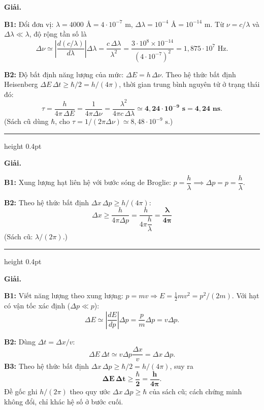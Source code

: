 \documentclass[11pt,a4paper]{article}
\renewcommand{\boldsymbol}[1]{\symbf{#1}}
\let\DeBaiOriginal\DeBai
\renewcommand{\DeBai}[1]{\par\Needspace{5\baselineskip}\DeBaiOriginal{#1}}
\newcommand{\PhanCachBai}{%
  \par\Needspace{7\baselineskip}%
  \addvspace{6pt}%
  {\color{black!40}\hrule height 0.4pt}%
  \nobreak\vspace{7pt}\nobreak
}
\begin{document}

\textbf{Giải.}

\textbf{B1:} Đổi đơn vị:
$\lambda=4000\text{ \AA}=4\cdot10^{-7}\text{ m}$,
$\Delta\lambda=10^{-4}\text{ \AA}=10^{-14}\text{ m}$.
Từ $\nu=c/\lambda$ và $\Delta\lambda\ll\lambda$, độ rộng tần số là
\[
\Delta\nu\simeq\left|\frac{d(c/\lambda)}{d\lambda}\right|\Delta\lambda
=\frac{c\,\Delta\lambda}{\lambda^2}
=\frac{3\cdot10^8\times10^{-14}}{(4\cdot10^{-7})^2}
=1{,}875\cdot10^7\text{ Hz}.
\]

\textbf{B2:} Độ bất định năng lượng của mức: $\Delta E=h\,\Delta\nu$.
Theo hệ thức bất định Heisenberg $\Delta E\,\Delta t\ge\hbar/2=h/(4\pi)$,
thời gian trung bình nguyên tử ở trạng thái đó:
\[
\tau=\frac{h}{4\pi\,\Delta E}=\frac1{4\pi\Delta\nu}
=\frac{\lambda^2}{4\pi c\,\Delta\lambda}
\simeq\boldsymbol{4{,}24\cdot10^{-9}\text{ s}=4{,}24\text{ ns}}.
\]
(Sách cũ dùng $\hbar$, cho $\tau=1/(2\pi\Delta\nu)\simeq8{,}48\cdot10^{-9}\text{ s}$.)

\PhanCachBai


\textbf{Giải.}

\textbf{B1:} Xung lượng hạt liên hệ với bước sóng de Broglie: $p = \dfrac{h}{\lambda} \implies \Delta p = p = \dfrac{h}{\lambda}$.

\textbf{B2:} Theo hệ thức bất định $\Delta x\,\Delta p\ge h/(4\pi)$:
\begin{equation*}
    \Delta x \ge \frac{h}{4\pi \Delta p} = \frac{h}{4\pi \dfrac{h}{\lambda}} = \boldsymbol{\frac{\lambda}{4\pi}}
\end{equation*}
(Sách cũ: $\lambda/(2\pi)$.)

\PhanCachBai


\textbf{Giải.}

\textbf{B1:} Viết năng lượng theo xung lượng: $p=mv\Rightarrow E=\tfrac12mv^2=p^2/(2m)$.
Với hạt có vận tốc xác định ($\Delta p\ll p$):
\[
\Delta E\simeq\left|\frac{dE}{dp}\right|\Delta p
=\frac{p}{m}\Delta p=v\Delta p.
\]

\textbf{B2:} Dùng $\Delta t=\Delta x/v$:
\[
\Delta E\,\Delta t\simeq
v\Delta p\frac{\Delta x}{v}=\Delta x\,\Delta p.
\]
\textbf{B3:} Theo hệ thức bất định $\Delta x\,\Delta p\ge\hbar/2=h/(4\pi)$, suy ra
\[
\boldsymbol{\Delta E\,\Delta t\ge\frac{\hbar}{2}=\frac{h}{4\pi}}.
\]
Đề gốc ghi $h/(2\pi)$ theo quy ước $\Delta x\,\Delta p\ge\hbar$ của sách cũ; cách chứng minh không đổi,
chỉ khác hệ số ở bước cuối.
\end{document}
